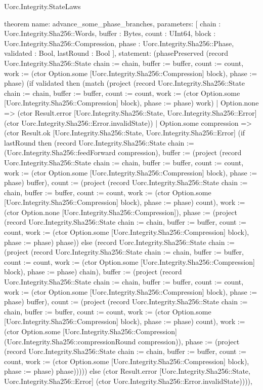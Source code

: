 \begin{lexlean}{Uorc.Integrity.StateLaws}
\begin{semanticmodule}
theorem{
  name: advance_some_phase_branches,
  parameters: [
    chain : Uorc.Integrity.Sha256::Words,
    buffer : Bytes,
    count : UInt64,
    block : Uorc.Integrity.Sha256::Compression,
    phase : Uorc.Integrity.Sha256::Phase,
    validated : Bool,
    lastRound : Bool
  ],
  statement: (phasePreserved (record Uorc.Integrity.Sha256::State {chain := chain, buffer := buffer, count := count, work := (ctor Option.some [Uorc.Integrity.Sha256::Compression] block), phase := phase}) (if validated then (match (project (record Uorc.Integrity.Sha256::State {chain := chain, buffer := buffer, count := count, work := (ctor Option.some [Uorc.Integrity.Sha256::Compression] block), phase := phase}) work)
    | Option.none => (ctor Result.error [Uorc.Integrity.Sha256::State, Uorc.Integrity.Sha256::Error] (ctor Uorc.Integrity.Sha256::Error.invalidState))
    | Option.some compression => (ctor Result.ok [Uorc.Integrity.Sha256::State, Uorc.Integrity.Sha256::Error] (if lastRound then (record Uorc.Integrity.Sha256::State {chain := (Uorc.Integrity.Sha256::feedForward compression), buffer := (project (record Uorc.Integrity.Sha256::State {chain := chain, buffer := buffer, count := count, work := (ctor Option.some [Uorc.Integrity.Sha256::Compression] block), phase := phase}) buffer), count := (project (record Uorc.Integrity.Sha256::State {chain := chain, buffer := buffer, count := count, work := (ctor Option.some [Uorc.Integrity.Sha256::Compression] block), phase := phase}) count), work := (ctor Option.none [Uorc.Integrity.Sha256::Compression]), phase := (project (record Uorc.Integrity.Sha256::State {chain := chain, buffer := buffer, count := count, work := (ctor Option.some [Uorc.Integrity.Sha256::Compression] block), phase := phase}) phase)}) else (record Uorc.Integrity.Sha256::State {chain := (project (record Uorc.Integrity.Sha256::State {chain := chain, buffer := buffer, count := count, work := (ctor Option.some [Uorc.Integrity.Sha256::Compression] block), phase := phase}) chain), buffer := (project (record Uorc.Integrity.Sha256::State {chain := chain, buffer := buffer, count := count, work := (ctor Option.some [Uorc.Integrity.Sha256::Compression] block), phase := phase}) buffer), count := (project (record Uorc.Integrity.Sha256::State {chain := chain, buffer := buffer, count := count, work := (ctor Option.some [Uorc.Integrity.Sha256::Compression] block), phase := phase}) count), work := (ctor Option.some [Uorc.Integrity.Sha256::Compression] (Uorc.Integrity.Sha256::compressionRound compression)), phase := (project (record Uorc.Integrity.Sha256::State {chain := chain, buffer := buffer, count := count, work := (ctor Option.some [Uorc.Integrity.Sha256::Compression] block), phase := phase}) phase)})))) else (ctor Result.error [Uorc.Integrity.Sha256::State, Uorc.Integrity.Sha256::Error] (ctor Uorc.Integrity.Sha256::Error.invalidState)))),
}
\end{semanticmodule}
\end{lexlean}

